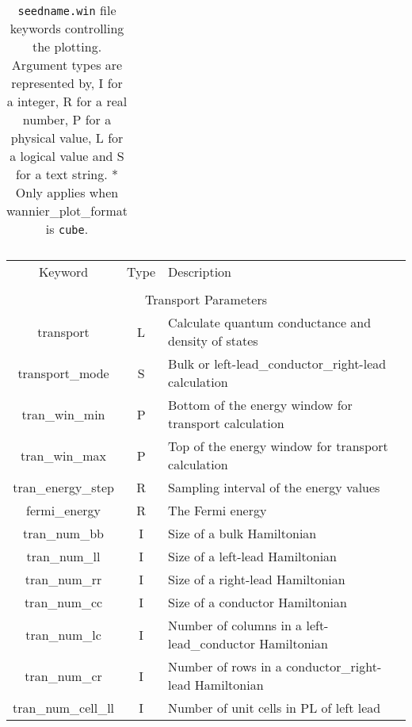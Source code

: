 \begin{table}
\begin{center}
\begin{tabular}{|c|c|p{6cm}|}
\hline
\end{tabular}
\caption[Parameter file keywords controlling plotting.]
{{\tt seedname.win} file keywords controlling the  plotting.  Argument types
are represented by, I for a integer, R for a real number, P for a
physical value, L for a logical value and S for a text string. * Only
applies when {\sc wannier\_plot\_format} is {\tt cube}.}
\label{parameter_keywords6}
\end{center}
\end{table}



\begin{table}
\begin{center}
\begin{tabular}{|c|c|p{6cm}|}
\hline
Keyword & Type & Description \\
        &      &             \\
\hline\hline
\multicolumn{3}{|c|}{Transport Parameters} \\
\hline
{\sc transport}   & L & Calculate quantum conductance and density of states \\
{\sc transport\_mode }  & S & Bulk or left-lead\_conductor\_right-lead calculation \\ 
{\sc tran\_win\_min } & P &  Bottom of the energy window for transport calculation\\  
{\sc tran\_win\_max } & P &  Top of the energy window for transport calculation\\ 
{\sc tran\_energy\_step } & R & Sampling interval of the energy values \\ 
{\sc fermi\_energy } & R & The Fermi energy \\
{\sc tran\_num\_bb } & I & Size of a bulk Hamiltonian \\  
{\sc tran\_num\_ll } & I & Size of a left-lead Hamiltonian \\
{\sc tran\_num\_rr } & I & Size of a right-lead Hamiltonian \\
{\sc tran\_num\_cc } & I & Size of a conductor Hamiltonian \\
{\sc tran\_num\_lc } & I & Number of columns in a left-lead\_conductor Hamiltonian \\
{\sc tran\_num\_cr } & I & Number of rows in a conductor\_right-lead Hamiltonian \\
{\sc tran\_num\_cell\_ll } & I & Number of unit cells in PL of left lead \\

\end{tabular}
\end{center}
\end{table}
